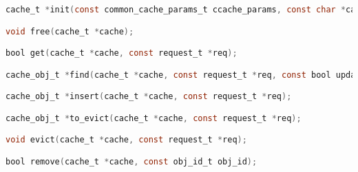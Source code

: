 \lstset{style=CStyle}

\begin{lstlisting}[language=C, caption=Functions required for cache eviction algorithms in libCacheSim, label=code: cache-functions]
cache_t *init(const common_cache_params_t ccache_params, const char *cache_specific_params);

void free(cache_t *cache);

bool get(cache_t *cache, const request_t *req);

cache_obj_t *find(cache_t *cache, const request_t *req, const bool update_cache);

cache_obj_t *insert(cache_t *cache, const request_t *req);

cache_obj_t *to_evict(cache_t *cache, const request_t *req);

void evict(cache_t *cache, const request_t *req);

bool remove(cache_t *cache, const obj_id_t obj_id);
\end{lstlisting}